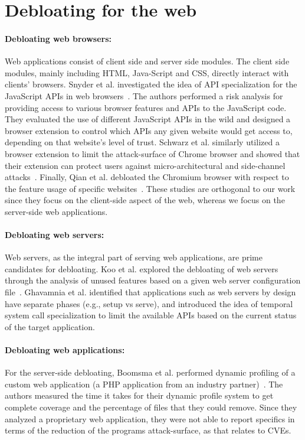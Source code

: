 \section{Debloating for the web}

\paragraph{Debloating web browsers:} Web applications consist of client side and server side modules. 
The client side modules, mainly including HTML, Java-Script and CSS, directly interact with clients' browsers. 
Snyder et al. investigated the idea of API specialization for the JavaScript APIs in web browsers~\cite{snyder2017vibrate}. 
The authors performed a risk analysis for providing access to various browser features and APIs to the JavaScript code.
They evaluated the use of different
JavaScript APIs in the wild and designed a browser extension
to control which APIs any given website would get access to, depending
on that website's level of trust. 
Schwarz et al. similarly utilized a browser
extension to limit the attack-surface of Chrome browser and showed that their extension can protect users against micro-architectural and side-channel attacks~\cite{Schwarz2018}. 
Finally, Qian et al. debloated the Chromium browser with respect to the feature usage of specific websites~\cite{qian2020slimium}. 
These studies are orthogonal to our work since
they focus on the client-side aspect of the web, whereas we focus on the server-side web applications. 

\paragraph{Debloating web servers:} Web servers, as the integral part of serving web applications, are prime candidates for debloating. 
Koo et al. explored the debloating of web servers through the analysis of unused features based on a given web server configuration file~\cite{koo2019configuration}. 
Ghavamnia et al. identified that applications such as web servers by design have separate phases (e.g., setup vs serve), and introduced the idea of temporal system call specialization to limit the available APIs based on the current status of the target application. 

\paragraph{Debloating web applications:} For the server-side debloating, Boomsma et al. performed dynamic profiling of a custom web application (a PHP application from an industry partner)~\cite{boomsma2012Dead}. 
The authors measured the time it takes for their dynamic profile system to get
complete coverage and the percentage of files that they could remove. Since they analyzed a proprietary web application, they were not able to report specifics
in terms of the reduction of the programs attack-surface, as that relates
to CVEs. 

